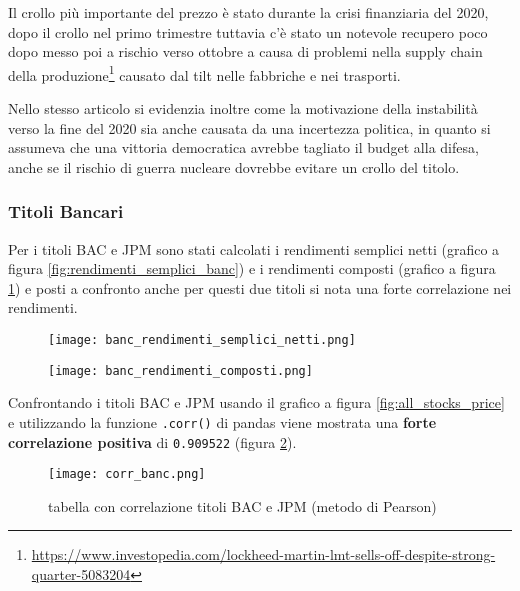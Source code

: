Il crollo più importante del prezzo è stato durante la crisi finanziaria del 2020, dopo il crollo nel primo trimestre tuttavia c'è stato un notevole recupero poco dopo messo poi a rischio verso ottobre a causa di problemi nella supply chain della
produzione\footnote{
  \href{https://www.investopedia.com/lockheed-martin-lmt-sells-off-despite-strong-quarter-5083204}{https://www.investopedia.com/lockheed-martin-lmt-sells-off-despite-strong-quarter-5083204}
}
causato dal tilt nelle fabbriche e nei trasporti.

Nello stesso articolo si evidenzia inoltre come la motivazione della instabilità verso la fine del 2020 sia anche causata da una incertezza politica, in quanto si assumeva che una vittoria democratica avrebbe tagliato il
budget alla difesa, anche se il rischio di guerra nucleare dovrebbe evitare un crollo del titolo.

\subsubsection{Titoli Bancari}

Per i titoli BAC e JPM sono stati calcolati i rendimenti semplici netti (grafico a figura \ref{fig:rendimenti_semplici_banc}) e i rendimenti composti (grafico a figura \ref{fig:rendimenti_compositi_banc}) e posti a confronto
anche per questi due titoli si nota una forte correlazione nei rendimenti.

\begin{figure}[h]
  \centering
  \begin{minipage}{.5\textwidth}
    \centering
    \texttt{[image: banc\_rendimenti\_semplici\_netti.png]}
    \label{fig:rendimenti_semplici_banc}
  \end{minipage}%
  \begin{minipage}{.5\textwidth}
    \centering
    \texttt{[image: banc\_rendimenti\_composti.png]}
    \label{fig:rendimenti_compositi_banc}
  \end{minipage}
\end{figure}

Confrontando i titoli BAC e JPM usando il grafico a figura \ref{fig:all_stocks_price} e utilizzando la funzione \verb|.corr()| di pandas
viene mostrata una \textbf{forte correlazione positiva} di \verb|0.909522| (figura \ref{fig:corr_banc}).

\begin{figure}[h]
  \centering
  \texttt{[image: corr\_banc.png]}
  \caption{tabella con correlazione titoli BAC e JPM (metodo di Pearson)}
  \label{fig:corr_banc}
\end{figure}

